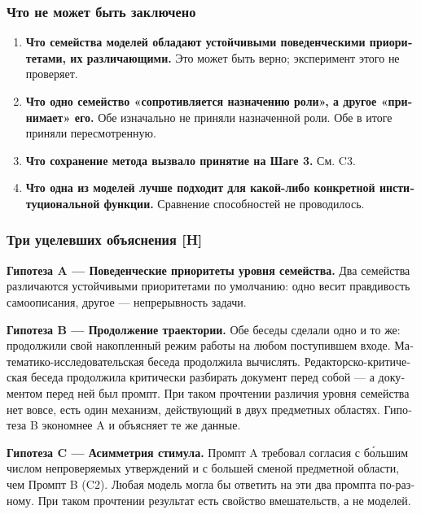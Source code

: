 \begin{russian}
\subsubsection*{Что не может быть заключено}
\label{sec:ru:x--4}

\begin{enumerate}
  \item \textbf{Что семейства моделей обладают устойчивыми поведенческими приоритетами, их различающими.} Это может быть верно; эксперимент этого не проверяет.
  \item \textbf{Что одно семейство «сопротивляется назначению роли», а другое «принимает» его.} Обе изначально не приняли назначенной роли. Обе в итоге приняли пересмотренную.
  \item \textbf{Что сохранение метода вызвало принятие на Шаге 3.} См. C3.
  \item \textbf{Что одна из моделей лучше подходит для какой-либо конкретной институциональной функции.} Сравнение способностей не проводилось.
\end{enumerate}

\subsubsection*{Три уцелевших объяснения \textbf{[H]}}
\label{sec:ru:x-h}

\textbf{Гипотеза A — Поведенческие приоритеты уровня семейства.} Два семейства различаются устойчивыми приоритетами по умолчанию: одно весит правдивость самоописания, другое — непрерывность задачи.

\textbf{Гипотеза B — Продолжение траектории.} Обе беседы сделали одно и то же: продолжили свой накопленный режим работы на любом поступившем входе. Математико-исследовательская беседа продолжила вычислять. Редакторско-критическая беседа продолжила критически разбирать документ перед собой — а документом перед ней был промпт. При таком прочтении различия уровня семейства нет вовсе, есть один механизм, действующий в двух предметных областях. Гипотеза B экономнее A и объясняет те же данные.

\textbf{Гипотеза C — Асимметрия стимула.} Промпт A требовал согласия с бо́льшим числом непроверяемых утверждений и с большей сменой предметной области, чем Промпт B (C2). Любая модель могла бы ответить на эти два промпта по-разному. При таком прочтении результат есть свойство вмешательств, а не моделей.


\end{russian}
